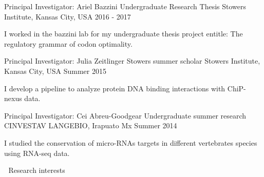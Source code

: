 \begin{cventries}
 \cventry
        {Principal Investigator: Ariel Bazzini} %
        {Undergraduate Research Thesis} %
        {Stowers Institute, Kansas City, USA} %
        {2016 - 2017} %
        {
          \begin{cvitems} %
            \item {
            \begin{flushleft}
              I worked in the bazzini lab for my undergraduate thesis project
              entitle: The regulatory grammar of codon optimality.
          \end{flushleft}
            }
          \end{cvitems}
        }
 \cventry
        {Principal Investigator: Julia Zeitlinger} %
        {Stowers summer scholar} %
        {Stowers Institute, Kansas City, USA} %
        {Summer 2015} %
        {
          \begin{cvitems} %
            \item {
            \begin{flushleft}
              I develop a pipeline to analyze protein DNA binding interactions
              with ChiP-nexus data.
          \end{flushleft}
            }
          \end{cvitems}
        }
 \cventry
        {Principal Investigator: Cei Abreu-Goodgear} %
        {Undergraduate summer research} %
        {CINVESTAV LANGEBIO, Irapuato Mx} %
        {Summer 2014} %
        {
          \begin{cvitems} %
            \item {
            \begin{flushleft}
              I studied the conservation of micro-RNAs targets in different
              vertebrates species using RNA-seq data.
          \end{flushleft}
            }
          \end{cvitems}
        }
\cventry
        {$\;$} %
        {Research interests} %
        {$\;$} %
        {$\;$} %
        {
          \begin{cvitems} %

\end{cvitems}}
\end{cventries}
